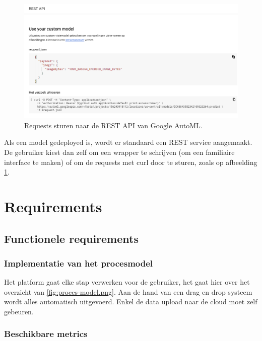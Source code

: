 \begin{figure}
    \centering
    \includegraphics[width=\linewidth]{img/google-automl-rest.png}
    \caption{Requests sturen naar de REST API van Google AutoML.}
    \label{fig:google-automl-rest}
\end{figure}

Als een model gedeployed is, wordt er standaard een REST service aangemaakt. De gebruiker kiest dan zelf om een wrapper te schrijven (om een familiaire interface te maken) of om de requests met curl door te sturen, zoals op afbeelding \ref{fig:google-automl-rest}. 


\section{Requirements}
\label{sec:google-requirements}

\subsection{Functionele requirements}
\label{subsec:google-fr}

\subsubsection{Implementatie van het procesmodel}
\label{sucsubsec:google-fr-procesmodel}

Het platform gaat elke stap verwerken voor de gebruiker, het gaat hier over het overzicht van \ref{fig:proces-model.png}. Aan de hand van een drag en drop systeem wordt alles automatisch uitgevoerd. Enkel de data upload naar de cloud moet zelf gebeuren.

\subsubsection{Beschikbare metrics}
\label{sucsubsec:google-fr-metrics}

